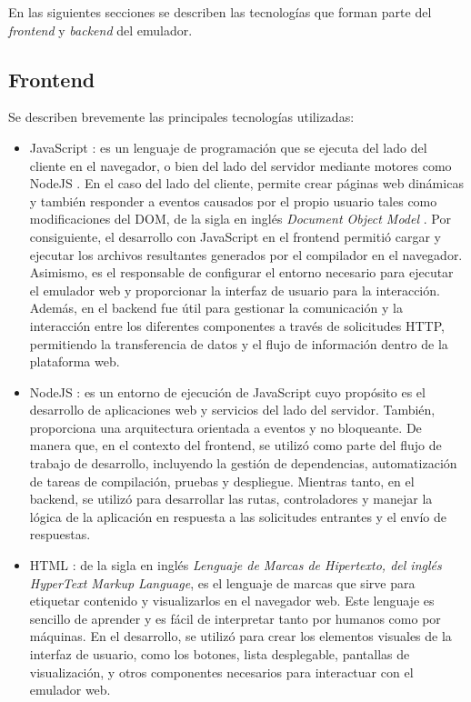 En las siguientes secciones se describen las tecnologías que forman parte del \textit{frontend} y \textit{backend} del emulador.

\subsection{Frontend}
\label{subsec:Frontend}

Se describen brevemente las principales tecnologías utilizadas:

\begin{itemize}
	\item JavaScript \citep{JavaScript}: es un lenguaje de programación que se ejecuta del lado del cliente en el navegador, o bien del lado del servidor mediante motores como NodeJS \citep{NodeJS}. En el caso del lado del cliente, permite crear páginas web dinámicas y también responder a eventos causados por el propio usuario tales como modificaciones del DOM, de la sigla en inglés  \textit{Document Object Model} \citep{DOM}. Por consiguiente, el desarrollo con JavaScript en el frontend permitió cargar y ejecutar los archivos resultantes generados por el compilador en el navegador. Asimismo, es el responsable de configurar el entorno necesario para ejecutar el emulador web y proporcionar la interfaz de usuario para la interacción. Además, en el backend fue útil para gestionar la comunicación y la interacción entre los diferentes componentes a través de solicitudes HTTP, permitiendo la transferencia de datos y el flujo de información dentro de la plataforma web.

	\item NodeJS \citep{NodeJS}: es un entorno de ejecución de JavaScript cuyo propósito es el desarrollo de aplicaciones web y servicios del lado del servidor. También, proporciona una arquitectura orientada a eventos y no bloqueante. 
De manera que, en el contexto del frontend, se utilizó como parte del flujo de trabajo de desarrollo, incluyendo la gestión de dependencias, automatización de tareas de compilación, pruebas y despliegue. Mientras tanto, en el backend, se utilizó para desarrollar las rutas, controladores y manejar la lógica de la aplicación en respuesta a las solicitudes entrantes y el envío de respuestas.

	\item HTML \citep{HTML}: de la sigla en inglés \textit{Lenguaje de Marcas de Hipertexto, del inglés HyperText Markup Language}, es el lenguaje de marcas que sirve para etiquetar contenido y visualizarlos en el navegador web.
	Este lenguaje es sencillo de aprender y es fácil de interpre­tar tanto por humanos como por máquinas.  En el desarrollo, se utilizó para crear los elementos visuales de la interfaz de usuario, como los botones, lista desplegable, pantallas de visualización, y otros componentes necesarios para interactuar con el emulador web.


\end{itemize}
